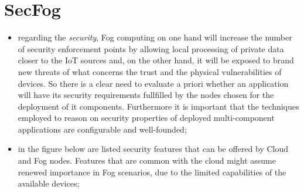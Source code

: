 \documentclass[oneside]{article}
\begin{document}
\section{SecFog}
\begin{itemize}
    \item regarding the \textit{security}, Fog computing on one hand will increase the number of security enforcement points by allowing local processing of private data closer to the IoT sources and, on the other hand, it will be exposed to brand new threats of what concerns the trust and the physical vulnerabilities of devices. So there is a clear need to evaluate a priori whether an application will have its security requirements fullfilled by the nodes chosen for the deployment of it components. Furthermore it is important that the techniques employed to reason on security properties of deployed multi-component applications are configurable and well-founded;
    
    \item in the figure below are listed security features that can be offered by Cloud and Fog nodes. Features that are common with the cloud might assume renewed importance in Fog scenarios, due to the limited capabilities of the available devices;
    \begin{figure}[!htb]
    \end{figure}
    

\end{itemize}
\end{document}
